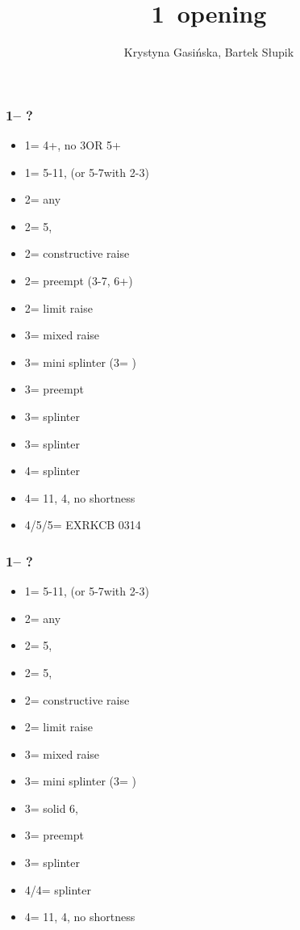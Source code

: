 \documentclass[12pt, a4paper]{article}
\title{1\major\ opening}
\author{Krystyna Gasińska, Bartek Słupik}
\begin{document}
\maketitle


\subsubsection*{1\hearts -- ?}
\begin{itemize}
    \item 1\spades = 4+\spades, no 3\hearts OR 5\hearts + \gf
    \item 1\nt = 5-11\hcp, (or 5-7\hcp with 2-3\hearts)
    \item 2\clubs = any \gf
    \item 2\diams = 5\diams, \gf
    \item 2\hearts = constructive raise
    \item 2\spades = \spades preempt (3-7, 6+\spades)
    \item 2\nt = limit raise
    \item 3\clubs = mixed raise
    \item 3\diams = mini splinter (3\hearts = \lsf)
    \item 3\hearts = preempt
    \item 3\spades = splinter \spades
    \item 3\nt = splinter \diams
    \item 4\clubs = splinter \clubs
    \item 4\diams = 11\hcp, 4\hearts, no shortness
    \item 4\spades/5\clubs/5\diams = EXRKCB 0314
\end{itemize}

\subsubsection*{1\spades -- ?}
\begin{itemize}
    \item 1\nt = 5-11\hcp, (or 5-7\hcp with 2-3\spades)
    \item 2\clubs = any \gf
    \item 2\diams = 5\diams, \gf
    \item 2\hearts = 5\hearts, \gf
    \item 2\spades = constructive raise
    \item 2\nt = limit raise
    \item 3\clubs = mixed raise
    \item 3\diams = mini splinter (3\hearts = \lsf)
    \item 3\hearts = solid 6\hearts, \inv
    \item 3\spades = preempt
    \item 3\nt = splinter \hearts
    \item 4\clubs/4\diams = splinter
    \item 4\hearts = 11\hcp, 4\spades, no shortness
\end{itemize}
\end{document}
